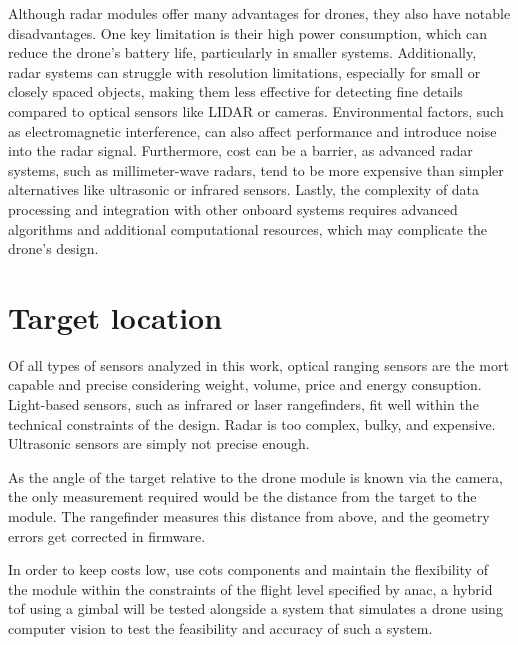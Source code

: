 Although radar modules offer many advantages for drones, they also have notable disadvantages.
One key limitation is their high power consumption, which can reduce the drone's battery life,
particularly in smaller systems. Additionally, radar systems can struggle with resolution limitations,
especially for small or closely spaced objects, making them less effective for detecting fine details
compared to optical sensors like LIDAR or cameras. Environmental factors, such as electromagnetic
interference, can also affect performance and introduce noise into the radar signal. Furthermore,
cost can be a barrier, as advanced radar systems, such as millimeter-wave radars, tend to be more
expensive than simpler alternatives like ultrasonic or infrared sensors. Lastly, the complexity of
data processing and integration with other onboard systems requires advanced algorithms and additional
computational resources, which may complicate the drone's design.

\section{Target location}

Of all types of sensors analyzed in this work, optical ranging sensors are the mort capable and
precise considering weight, volume, price and energy consuption. Light-based sensors, such as
infrared or laser rangefinders, fit well within the technical constraints of the design. Radar
is too complex, bulky, and expensive. Ultrasonic sensors are simply not precise enough.

As the angle of the target relative to the drone module is known via the camera, the only
measurement required would be the distance from the target to the module. The rangefinder measures
this distance from above, and the geometry errors get corrected in firmware.

In order to keep costs low, use \gls{cots} components and maintain the flexibility of the module within
the constraints of the flight level specified by \gls{anac}, a hybrid \gls{tof} using a gimbal will be
tested alongside a system that simulates a drone using computer vision to test the feasibility
and accuracy of such a system.

